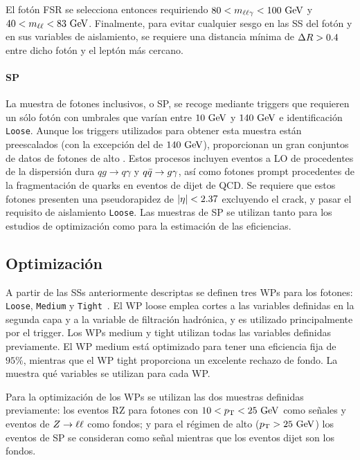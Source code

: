 El fotón \ac{FSR} se selecciona entonces requiriendo \(80<m_{\ell\ell\gamma}<100~\text{GeV}\) y \(40<m_{\ell\ell}<83~\text{GeV}\). Finalmente, para evitar cualquier sesgo en las \ac{SS} del fotón y en sus variables de aislamiento, se requiere una distancia mínima de \(\Delta R>0.4\) entre dicho fot\'on y el leptón más cercano.


\paragraph{\acf{SP}}

La muestra de fotones inclusivos, o \acf{SP}, se recoge mediante triggers que requieren un s\'olo fot\'on con umbrales que var\'ian entre \(10~\text{GeV}\) y \(140~\text{GeV}\) e identificación \texttt{Loose}. Aunque los triggers utilizados para obtener esta muestra están preescalados (con la excepción del de \(140~\text{GeV}\)), proporcionan un gran conjuntos de datos de fotones de alto \pt.
Estos procesos incluyen eventos a \ac{LO} de \gammajet procedentes de la dispersión dura \(qg\to q\gamma\) y \(q\bar{q} \rightarrow g\gamma\), así como fotones prompt procedentes de la fragmentación de quarks en eventos de dijet de \acs{QCD}.
Se requiere que estos fotones presenten una pseudorapidez de \(|\eta|<2.37\) excluyendo el crack, y pasar el requisito de aislamiento \texttt{Loose}. Las muestras de \ac{SP} se utilizan tanto para los estudios de optimización como para la estimaci\'on de las eficiencias.


\subsection{Optimizaci\'on}
\label{subsec:pid_ss:pid:optimisation}

A partir de las \acp{SS} anteriormente descriptas se definen tres \acp{WP} para los fotones: \texttt{Loose}, \texttt{Medium} y \texttt{Tight}~\cite{ATLAS-EGamma-Performance-2024}. El \ac{WP} loose emplea cortes a las variables definidas en la segunda capa y a la variable de filtraci\'on hadrónica, y es utilizado principalmente por el trigger.
Los \acp{WP} medium y tight utilizan todas las variables definidas previamente. El \ac{WP} medium está optimizado para tener una eficiencia fija de \(95\%\), mientras que el \ac{WP} tight proporciona un excelente rechazo de fondo. La \Tab{\ref{tab:pid_ss:ss:ss_variables}} muestra qué variables se utilizan para cada \ac{WP}.

Para la optimización de los \acp{WP} se utilizan las dos muestras definidas previamente: los eventos \ac{RZ} para fotones con \(10<p_{\text{T}}<25~\text{GeV}\) como señales y eventos de \(Z\rightarrow \ell\ell\) como fondos; y para el régimen de alto \pt (\(p_{\text{T}}>25~\text{GeV}\)) los eventos de \ac{SP} se consideran como señal mientras que los eventos dijet son los fondos.

